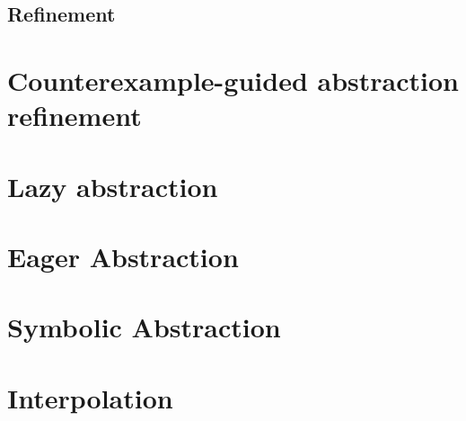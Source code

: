 \subsection{Refinement}

\section{Counterexample-guided abstraction refinement}



\section{Lazy abstraction}

\section{Eager Abstraction}

\section{Symbolic Abstraction}

\section{Interpolation}

